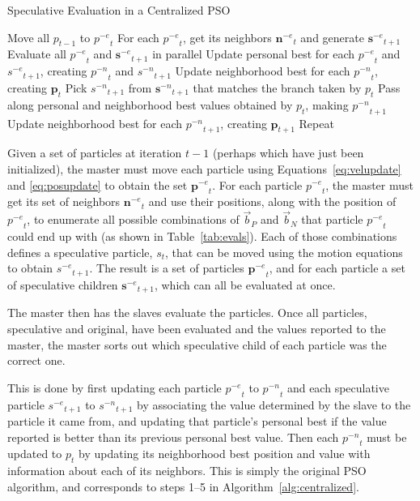 \documentclass[journal,letterpaper]{IEEEtran}
\newcommand{\alg}[1]{Algorithm~\ref{alg:#1}}
\providecommand{\nbest}{\ensuremath{\Vec{b}_N}}
\providecommand{\pbest}{\ensuremath{\Vec{b}_P}}
\providecommand{\noeval}[1]{\ensuremath{#1^{-e}}}
\providecommand{\nonbest}[1]{\ensuremath{#1^{-n}}}
\providecommand{\p}{\ensuremath{p}}
\providecommand{\pset}{\ensuremath{\mathbf{p}}}
\providecommand{\s}{\ensuremath{s}}
\providecommand{\sset}{\ensuremath{\mathbf{s}}}
\providecommand{\nset}{\ensuremath{\mathbf{n}}}
\begin{document}
\begin{algorithm}
  \caption{Speculative Evaluation in a Centralized PSO}
  \label{alg:centralized}
  \begin{algorithmic}[1]
	\STATE Move all $\p_{t-1}$ to $\noeval{\p}_t$
	\STATE For each $\noeval{\p}_t$, get its neighbors $\noeval{\nset}_t$ and
	  generate $\noeval{\sset}_{t+1}$
	\STATE Evaluate all $\noeval{\p}_t$ and $\noeval{\sset}_{t+1}$ in parallel
	\STATE Update personal best for each $\noeval{\p}_t$ and
	  $\noeval{\s}_{t+1}$, creating $\nonbest{\p}_t$ and $\nonbest{\s}_{t+1}$
	\STATE Update neighborhood best for each $\nonbest{\p}_t$, creating
	  $\pset_t$
	\FORALL{$\p_t$}
	\STATE Pick $\nonbest{\s}_{t+1}$ from $\nonbest{\sset}_{t+1}$ that matches
	  the branch taken by $\p_t$
	\STATE Pass along personal and neighborhood best values obtained by $\p_t$,
	  making $\nonbest{\p}_{t+1}$
	\ENDFOR
	\STATE Update neighborhood best for each $\nonbest{\p}_{t+1}$, creating
	  $\pset_{t+1}$
	\STATE Repeat
  \end{algorithmic}
\end{algorithm}

Given a set of particles at iteration $t-1$ (perhaps which have just been
initialized), the master must move each particle using
Equations~\eqref{eq:velupdate} and \eqref{eq:posupdate} to obtain the set
$\noeval{\pset}_t$.  For each particle $\noeval{\p}_t$, the master must get its
set of neighbors $\noeval{\nset}_t$ and use their positions, along with the
position of $\noeval{\p}_t$, to enumerate all possible combinations of $\pbest$
and $\nbest$ that particle $\noeval{\p}_t$ could end up with (as shown in
Table~\ref{tab:evals}).  Each of those combinations defines a speculative
particle, $\s_t$, that can be moved using the motion equations to obtain
$\noeval{\s}_{t+1}$.  The result is a set of particles $\noeval{\pset}_t$, and
for each particle a set of speculative children $\noeval{\sset}_{t+1}$, which
can all be evaluated at once.

The master then has the slaves evaluate the particles.  Once all particles,
speculative and original, have been evaluated and the values reported to the
master, the master sorts out which speculative child of each particle was the
correct one.

This is done by first updating each particle $\noeval{\p}_t$ to
$\nonbest{\p}_t$ and each speculative particle $\noeval{\s}_{t+1}$ to
$\nonbest{\s}_{t+1}$ by associating the value determined by the slave to the
particle it came from, and updating that particle's personal best if the value
reported is better than its previous personal best value.  Then each
$\nonbest{\p}_t$ must be updated to $\p_t$ by updating its neighborhood best
position and value with information about each of its neighbors.  This is
simply the original PSO algorithm, and corresponds to steps 1--5 in
\alg{centralized}.
\end{document}
